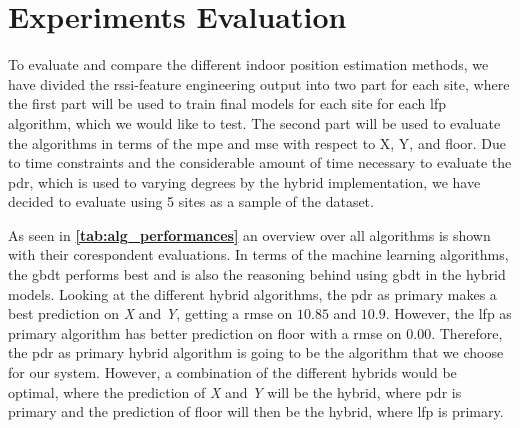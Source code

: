 \section{Experiments Evaluation}
To evaluate and compare the different indoor position estimation methods, we have divided the \gls{rssi}-feature engineering output into two part for each site, where the first part will be used to train final models for each site for each \gls{lfp} algorithm, which we would like to test. The second part will be used to evaluate the algorithms in terms of the \gls{mpe} and \gls{mse} with respect to X, Y, and floor.  Due to time constraints and the considerable amount of time necessary to evaluate the \gls{pdr}, which is used to varying degrees by the hybrid implementation, we have decided to evaluate using 5 sites as a sample of the dataset.


As seen in \textbf{\autoref{tab:alg_performances}} an overview over all algorithms is shown with their corespondent evaluations. In terms of the machine learning algorithms, the \gls{gbdt} performs best and is also the reasoning behind using \gls{gbdt} in the hybrid models. Looking at the different hybrid algorithms, the \gls{pdr} as primary makes a best prediction on \textit{X} and \textit{Y}, getting a \gls{rmse} on $10.85$ and $10.9$. However, the \gls{lfp} as primary algorithm has better prediction on floor with a \gls{rmse} on $0.00$. 
Therefore, the \gls{pdr} as primary hybrid algorithm is going to be the algorithm that we choose for our system. However, a combination of the different hybrids would be optimal, where the prediction of \textit{X} and \textit{Y} will be the hybrid, where \gls{pdr} is primary and the prediction of floor will then be the hybrid, where \gls{lfp} is primary. 


